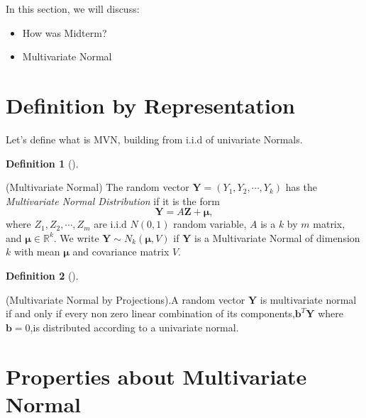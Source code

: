 \documentclass[
  letterpaper,
  DIV=11,
  numbers=noendperiod]{scrreprt}
\providecommand{\tightlist}{%
  \setlength{\itemsep}{0pt}\setlength{\parskip}{0pt}}\usepackage{longtable,booktabs,array}
\theoremstyle{definition}
\newtheorem{definition}{Definition}[chapter]
\theoremstyle{plain}
\theoremstyle{remark}
\begin{document}

In this section, we will discuss:

\begin{itemize}
\tightlist
\item
  How was Midterm?
\item
  Multivariate Normal
\end{itemize}

\hypertarget{definition-by-representation}{%
\section*{Definition by
Representation}\label{definition-by-representation}}


Let's define what is MVN, building from i.i.d of univariate Normals.

\leavevmode{}%
\begin{definition}[]\label{def-MVN}

(Multivariate Normal) The random vector
\(\mathbf{Y} = (Y_1, Y_2, \cdots, Y_k)\) has the \emph{Multivariate
Normal Distribution} if it is the form
\[\mathbf{Y} = A \mathbf{Z} + \mathbf{\mu}, \] where
\(Z_1, Z_2, \cdots, Z_m\) are i.i.d \(N(0,1)\) random variable, \(A\) is
a \(k\) by \(m\) matrix, and \(\mathbf{\mu} \in \mathbb{R}^k\). We write
\(\mathbf{Y} \sim N_k(\mathbf{\mu}, V)\) if \(\mathbf{Y}\) is a
Multivariate Normal of dimension \(k\) with mean \(\mathbf{\mu}\) and
covariance matrix \(V\).

\end{definition}

\leavevmode{}%
\begin{definition}[]\label{def-MVN-2}

(Multivariate Normal by Projections).A random vector \(\mathbf{Y}\) is
multivariate normal if and only if every non zero linear combination of
its components,\(\mathbf{b}^T\mathbf{Y}\) where \(\mathbf{b}=0\),is
distributed according to a univariate normal.

\end{definition}

\hypertarget{properties-about-multivariate-normal}{%
\section*{Properties about Multivariate
Normal}\label{properties-about-multivariate-normal}}
\end{document}
